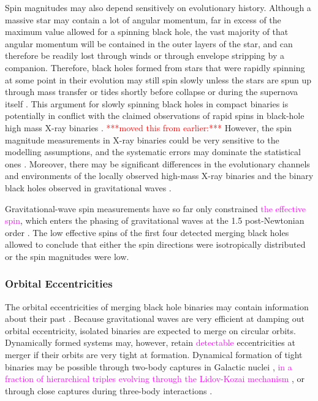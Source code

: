 \documentclass[iop,onecolumn]{revtex4}
\newcommand{\ajf}[1]{\textcolor{red}{#1}}
\newcommand{\ilya}[1]{\textcolor{magenta}{#1}}
\begin{document}
Spin magnitudes may also depend sensitively on evolutionary history.  Although a massive star may contain a lot of angular momentum, far in excess of the maximum value allowed for a spinning black hole, the vast majority of that angular momentum will be contained in the outer layers of the star, and can therefore be readily lost through winds or through envelope stripping by a companion.  Therefore, black holes formed from stars that were rapidly spinning at some point in their evolution may still spin slowly unless the stars are spun up through mass transfer or tides shortly before collapse \citep{Kushnir:2016,HotokezakaPiran:2017,Zaldarriaga:2017} or during the supernova itself \citep{Batta:2017,Schroeder:2018}.   This argument for slowly spinning black holes in compact binaries is potentially in conflict with the claimed observations of rapid spins in black-hole high mass X-ray binaries \citep{MillerMiller:2015}. \ajf{***moved this from earlier:***}   However, the spin magnitude measurements in X-ray binaries could be very sensitive to the modelling assumptions, and the systematic errors may dominate the statistical ones \citep[e.g.,][]{Basak:2017,Kawano:2017}. Moreover, there may be significant differences in the evolutionary channels and environments of the locally observed high-mass X-ray binaries and the binary black holes observed in gravitational waves \citep{HotokezakaPiran:2017}.

Gravitational-wave spin measurements have so far only constrained \ilya{the effective spin}, which enters the phasing of gravitational waves at the 1.5 post-Newtonian order \citep{PoissonWill:1995}.  The low effective spins of the first four detected merging black holes allowed \citet{Farr:2017} to conclude that either the spin directions were isotropically distributed or the spin magnitudes were low.

\subsubsection{Orbital Eccentricities}
	The orbital eccentricities of merging black hole binaries may contain information about their past \citep{MandelOShaughnessy:2010}. Because gravitational waves are very efficient at damping out orbital eccentricity, isolated binaries are expected to merge on circular orbits. Dynamically formed systems may, however, retain \ilya{detectable} eccentricities at merger if their orbits are very tight at formation. Dynamical formation of tight binaries may be possible  through two-body captures in Galactic nuclei \citep{OLeary:2008} \citep[but see][]{Tsang:2013}, \ilya{in a fraction of hierarchical triples evolving through the Lidov-Kozai mechanism \citep[e.g.,][]{AntoniniPerets:2012}}, or through close captures during three-body interactions \citep{Samsing:2014, Rodriguez:2018}. 
\end{document}
